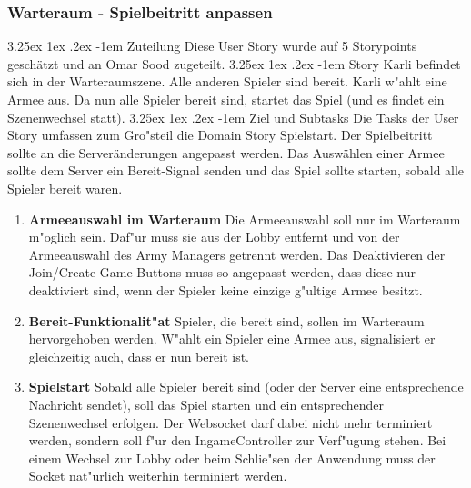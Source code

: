 \documentclass[12pt, titlepage]{scrartcl}
\makeatletter
\renewcommand\paragraph{\@startsection{paragraph}{5}{\z@}%
  {3.25ex \@plus1ex \@minus.2ex}%
  {-1em}%
  {\normalfont\normalsize\bfseries}}
\makeatother
\begin{document}
	        \subsubsection{Warteraum - Spielbeitritt anpassen}
	            \paragraph{Zuteilung}
	                	Diese User Story wurde auf 5 Storypoints gesch\"atzt und an Omar Sood zugeteilt.
	            \paragraph{Story}
	            		Karli befindet sich in der Warteraumszene. Alle anderen Spieler sind bereit. Karli w"ahlt eine Armee aus. Da nun alle Spieler bereit sind, startet das Spiel (und es findet ein Szenenwechsel statt).
	            \paragraph{Ziel und Subtasks}
		         		Die Tasks der User Story umfassen zum Gro"steil die Domain Story Spielstart. Der Spielbeitritt sollte an die Server\"anderungen angepasst werden. Das Ausw\"ahlen einer Armee sollte dem Server ein Bereit-Signal senden und das Spiel sollte starten, sobald alle Spieler bereit waren.
	                	\begin{enumerate}[label={}]
		                	\item \textbf{Armeeauswahl im Warteraum} \hspace{5pt} Die Armeeauswahl soll nur im Warteraum m"oglich sein. Daf"ur muss sie aus der Lobby entfernt und von der Armeeauswahl des Army Managers getrennt werden. Das Deaktivieren der Join/Create Game Buttons muss so angepasst werden, dass diese nur deaktiviert sind, wenn der Spieler keine einzige g"ultige Armee besitzt.
		                	\item \textbf{Bereit-Funktionalit"at} \hspace{5pt} Spieler, die bereit sind, sollen im Warteraum hervorgehoben werden. W"ahlt ein Spieler eine Armee aus, signalisiert er gleichzeitig auch, dass er nun bereit ist.
		                	\item \textbf{Spielstart} \hspace{5pt} Sobald alle Spieler bereit sind (oder der Server eine entsprechende Nachricht sendet), soll das Spiel starten und ein entsprechender Szenenwechsel erfolgen. Der Websocket darf dabei nicht mehr terminiert werden, sondern soll f"ur den IngameController zur Verf"ugung stehen. Bei einem Wechsel zur Lobby oder beim Schlie"sen der Anwendung muss der Socket nat"urlich weiterhin terminiert werden.
	                \end{enumerate}
\end{document}
